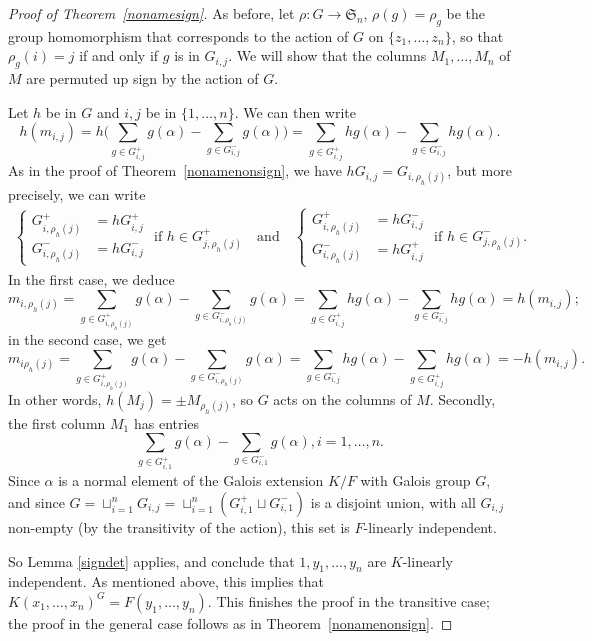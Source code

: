 \documentclass[12pt]{article}
\theoremstyle{plain}
\begin{document}
\begin{proof}[Proof of Theorem~\ref{nonamesign}]
As before, let $\rho: G \to \mathfrak{S}_n$, $\rho(g) =
\rho_g$ be the group homomorphism that corresponds to the action of
$G$ on $\lbrace z_1, \ldots , z_n \rbrace$, so that $\rho_g(i) = j$ if
and only if $g$ is in $G_{i,j}$. We will show that the columns
$M_1,\dots,M_n$ of $M$ are permuted up sign by the action of $G$.

Let $h$ be in $G$
and  $i,j$ be in $\lbrace 1, \ldots, n \rbrace$. We 
can then write
$$h(m_{i,j}) = h\Big( \sum_{g\in G^{+}_{i,j}}g(\alpha) -\sum_{g\in
  G^{-}_{i,j}}g(\alpha)\Big) = \sum_{g\in G^{+}_{i,j}}hg(\alpha)
-\sum_{g\in G^{-}_{i,j}}hg(\alpha).$$ 
As in the proof of Theorem~\ref{nonamenonsign}, we have
$hG_{i,j} = G_{i,\rho_h(j)}$, but more precisely, we can write
\begin{align}
\left \{
\begin{array}{ll}
  G^{+}_{i,\rho_{h}(j)}&= hG^{+}_{i,j}\\
G^{-}_{i,\rho_h(j)}&= hG^{-}_{i,j}
\end{array}\right .
\text{~if~} h \in G^+_{j,\rho_h(j)}
\quad\text{and}\quad
\left \{
\begin{array}{cl}
  G^{+}_{i,\rho_{h}(j)}&= hG^{-}_{i,j}\\
G^{-}_{i,\rho_h(j)}&= hG^{+}_{i,j}
\end{array}\right .
\text{~if~} h \in G^-_{j,\rho_h(j)}.
\end{align}
In the first case, we deduce
$$m_{i,\rho_h(j)} =  \sum_{g\in G^{+}_{i,\rho_h(j)}}g(\alpha) -\sum_{g\in G^{-}_{i,\rho_h(j)}}g(\alpha) 
                  =  \sum_{g\in G^{+}_{i,j}}hg(\alpha) -\sum_{g\in G^{-}_{i,j}}hg(\alpha)
=h(m_{i,j});$$
in the second case, we get
$$m_{i\rho_h(j)} = \sum_{g\in G^{+}_{i,\rho_h(j)}}g(\alpha)
-\sum_{g\in G^{-}_{i,\rho_h(j)}}g(\alpha) = \sum_{g\in
  G^{-}_{i,j}}hg(\alpha) -\sum_{g\in
  G^{+}_{i,j}}hg(\alpha)=-h(m_{i,j}).$$ In other words, $h(M_j) = \pm
M_{\rho_h(j)}$, so $G$ acts on the columns of $M$.
Secondly, the first column $M_1$ has entries 
$$\sum_{g \in G^{+}_{i,1}}g(\alpha)- \sum_{g \in
  G^{-}_{i,1}}g(\alpha), i = 1, \ldots,n.$$ Since $\alpha$ is a normal
element of the Galois extension $K/F$ with Galois group $G$, and since
$G = \sqcup^n_{i =1}G_{i,j}= \sqcup^n_{i =1}(G^{+}_{i,1} \sqcup
G^{-}_{i,1}) $ is a disjoint union, with all $G_{i,j}$ non-empty (by
the transitivity of the action), this set is $F$-linearly independent.

So Lemma \ref{signdet} applies, and conclude that $1, y_1, \ldots,
y_n$ are $K$-linearly independent. As mentioned above, this implies
that $K(x_1,\dots,x_n)^G=F(y_1,\dots,y_n)$.  This finishes the proof
in the transitive case; the proof in the general case follows  as in Theorem~\ref{nonamenonsign}.
\end{proof}
\end{document}
